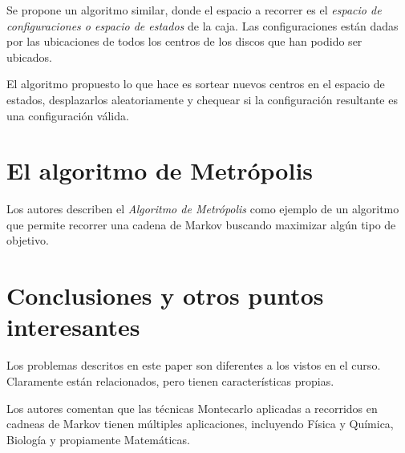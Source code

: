 \documentclass[12pt]{article}
\begin{document}
Se propone un algoritmo similar, donde el espacio a recorrer es el \textit{espacio de configuraciones o espacio de estados} de la caja. Las configuraciones están dadas por las ubicaciones de todos los centros de los discos que han podido ser ubicados.

El algoritmo propuesto lo que hace es sortear nuevos centros en el espacio de estados, desplazarlos aleatoriamente y chequear si la configuración resultante es una configuración válida.

\section{El algoritmo de Metrópolis}

Los autores describen el \textit{Algoritmo de Metrópolis} como ejemplo de un algoritmo que permite recorrer una cadena de Markov buscando maximizar algún tipo de objetivo.

\section{Conclusiones y otros puntos interesantes}

Los problemas descritos en este paper son diferentes a los vistos en el curso. Claramente están relacionados, pero tienen características propias.

Los autores comentan que las técnicas Montecarlo aplicadas a recorridos en cadneas de Markov tienen múltiples aplicaciones, incluyendo Física y Química, Biología y propiamente Matemáticas.
\end{document}
